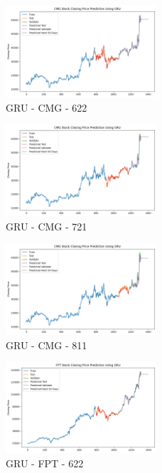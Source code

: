 \documentclass{ieeeojies}
\begin{document}
\begin{figure} [H]
    \centering
    \includegraphics[width=0.5\textwidth]{bibliography/Figure/GRU_CMG_622_90.png}
    \caption{GRU - CMG - 622}
    \label{fig:GRU_CMG_622_90}
\end{figure}
\begin{figure} [H]
    \centering
    \includegraphics[width=0.5\textwidth]{bibliography/Figure/GRU_CMG_721_90.png}
    \caption{GRU - CMG - 721}
    \label{fig:GRU_CMG_721_90}
\end{figure}
\begin{figure} [H]
    \centering
    \includegraphics[width=0.5\textwidth]{bibliography/Figure/GRU_CMG_811_90.png}
    \caption{GRU - CMG - 811}
    \label{fig:GRU_CMG_811_90}
\end{figure}
\begin{figure} [H]
    \centering
    \includegraphics[width=0.5\textwidth]{bibliography/Figure/GRU_FPT_622_90.png}
    \caption{GRU - FPT - 622}
    \label{fig:GRU_FPT_622_90}
\end{figure}
\end{document}
